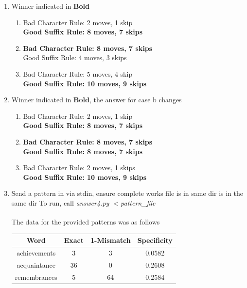 \documentclass[12pt]{article}
\begin{document}
\begin{enumerate}
\begin{enumerate}[label=(\alph*)]
    \end{enumerate}
    \item Winner indicated in \textbf{Bold}
    \begin{enumerate}[label=(\alph*)]
        \item
        Bad Character Rule: 2 moves, 1 skip
         \\ \textbf{Good Suffix Rule: 8 moves, 7 skips}
        \item
        \textbf{Bad Character Rule: 8 moves, 7 skips}
        \\ Good Suffix Rule: 4 moves, 3 skips
        \item
        Bad Character Rule: 5 moves, 4 skip
        \\ \textbf{Good Suffix Rule: 10 moves, 9 skips}
    \end{enumerate}
    \item Winner indicated in \textbf{Bold}, the answer for case b changes
    \begin{enumerate}[label=(\alph*)]
        \item
        Bad Character Rule: 2 moves, 1 skip
         \\ \textbf{Good Suffix Rule: 8 moves, 7 skips}
        \item
        \textbf{Bad Character Rule: 8 moves, 7 skips}
        \\ \textbf{Good Suffix Rule: 8 moves, 7 skips}
        \item
        Bad Character Rule: 2 moves, 1 skips
        \\ \textbf{Good Suffix Rule: 10 moves, 9 skips}
    \end{enumerate}
    \item Send a pattern in via stdin, ensure complete works file is in same dir is in the same dir To run, call
    \textit{answer4.py $<$pattern\_file} \\ \\
    The data for the provided patterns was as follows \\
    \begin{flushleft}
        \begin{tabular}{ |c|c|c|c| }
        \hline
        \textbf{Word} & \textbf{Exact} & \textbf{1-Mismatch} & \textbf{Specificity} \\
        \hline
        achievements & 3 & 3 & 0.0582 \\
        acquaintance & 36 & 0 & 0.2608 \\
        remembrances & 5 & 64 & 0.2584 \\

\end{tabular}
\end{flushleft}
\end{enumerate}
\end{document}
